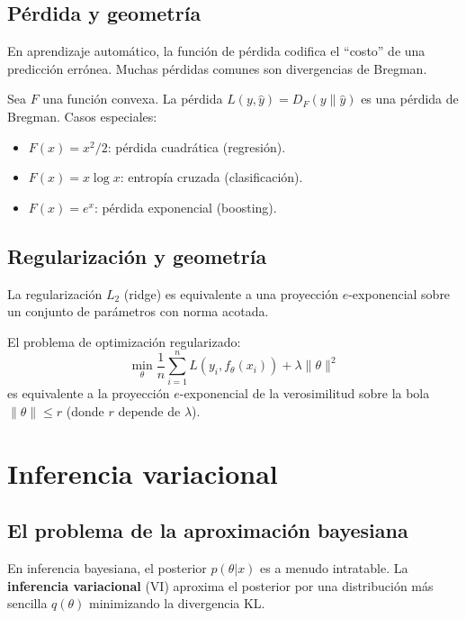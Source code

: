 \subsection{Pérdida y geometría}

En aprendizaje automático, la función de pérdida codifica el ``costo'' de una predicción errónea.  Muchas pérdidas comunes son divergencias de Bregman.

\begin{theorem}
	Sea $F$ una función convexa.  La pérdida $L(y, \hat{y}) = D_F(y \| \hat{y})$ es una pérdida de Bregman.  Casos especiales:
	\begin{itemize}
		\item $F(x) = x^2/2$: pérdida cuadrática (regresión).
		\item $F(x) = x\log x$: entropía cruzada (clasificación).
		\item $F(x) = e^x$: pérdida exponencial (boosting).
	\end{itemize}
\end{theorem}

\subsection{Regularización y geometría}

La regularización $L_2$ (ridge) es equivalente a una proyección $e$-exponencial sobre un conjunto de parámetros con norma acotada.

\begin{proposition}
	El problema de optimización regularizado:
	\[
	\min_\theta \frac{1}{n}\sum_{i=1}^n L(y_i, f_\theta(x_i)) + \lambda \|\theta\|^2
	\]
	es equivalente a la proyección $e$-exponencial de la verosimilitud sobre la bola $\|\theta\| \le r$ (donde $r$ depende de $\lambda$).
\end{proposition}

\section{Inferencia variacional}

\subsection{El problema de la aproximación bayesiana}

En inferencia bayesiana, el posterior $p(\theta | x)$ es a menudo intratable.  La \textbf{inferencia variacional} (VI) aproxima el posterior por una distribución más sencilla $q(\theta)$ minimizando la divergencia KL.

